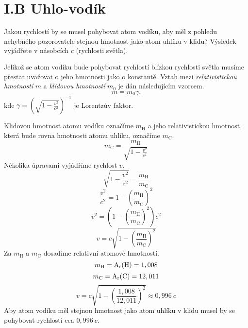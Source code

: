 \documentclass{../../../../style/mkimain}
\begin{document}
\section*{I.B Uhlo-vodík}
\noindent Jakou rychlostí by se musel pohybovat atom vodíku, aby měl z pohledu nehybného pozorovatele stejnou hmotnost jako atom uhlíku v klidu? 
Výsledek vyjádřete v násobcích $c$ (rychlosti světla).
\vspace{1cm}

Jelikož se atom vodíku bude pohybovat rychlostí blízkou rychlosti světla musíme přestat 
uvažovat o jeho hmotnosti jako o konstantě. Vztah mezi \emph{relativistickou hmotností} $m$ 
a \emph{klidovou hmotností} $m_0$ je dán následujícím vzorcem.
$$
m=m_0\gamma\text{,}
$$
kde $\gamma=\left(\sqrt{1-\frac{v^2}{c^2}}\right)^{-1}$ je Lorentzův faktor.

Klidovou hmotnost atomu vodíku označíme $m_\mathrm{H}$ a jeho relativistickou hmotnost, která 
bude rovna hmotnosti atomu uhlíku, označíme $m_\mathrm{C}$. 
$$
m_\mathrm{C}=\frac{m_\mathrm{H}}{\sqrt{1-\frac{v^2}{c^2}}}
$$
Několika úpravami vyjádříme rychlost $v$.
$$
\sqrt{1-\frac{v^2}{c^2}}=\frac{m_\mathrm{H}}{m_\mathrm{C}}
$$
$$
\frac{v^2}{c^2}=1-\left(\frac{m_\mathrm{H}}{m_\mathrm{C}}\right)^2
$$
$$
v^2=\left(1-\left(\frac{m_\mathrm{H}}{m_\mathrm{C}}\right)^2\right)c^2
$$
$$
v=c\sqrt{1-\left(\frac{m_\mathrm{H}}{m_\mathrm{C}}\right)^2}
$$
Za $m_\mathrm{H}$ a $m_\mathrm{C}$ dosadíme relativní atomové hmotnosti.
$$
m_\mathrm{H}=\mathrm{A_r(\ce{H})}=1,008
$$
$$
m_\mathrm{C}=\mathrm{A_r(\ce{C})}=12,011
$$
$$
v=c\sqrt{1-\left(\frac
{1,008}{12,011}\right)^2}\approx0,996\ c
$$
Aby atom vodíku měl stejnou hmotnost jako atom uhlíku v klidu musel by se pohybovat rychlostí cca $0,996\ c$.\\
\end{document}
